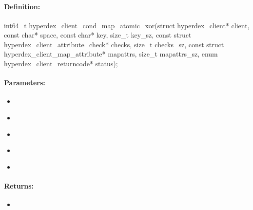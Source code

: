 \pagebreak
\subsection{}
\label{api:c:cond_map_atomic_xor}


\paragraph{Definition:}
\begin{ccode}
int64_t hyperdex_client_cond_map_atomic_xor(struct hyperdex_client* client,
        const char* space,
        const char* key, size_t key_sz,
        const struct hyperdex_client_attribute_check* checks, size_t checks_sz,
        const struct hyperdex_client_map_attribute* mapattrs, size_t mapattrs_sz,
        enum hyperdex_client_returncode* status);
\end{ccode}

\paragraph{Parameters:}
\begin{itemize}[noitemsep]
\item {}\\

\item {}\\

\item {}\\

\item {}\\

\item {}\\

\end{itemize}

\paragraph{Returns:}
\begin{itemize}[noitemsep]
\item {}\\

\end{itemize}

